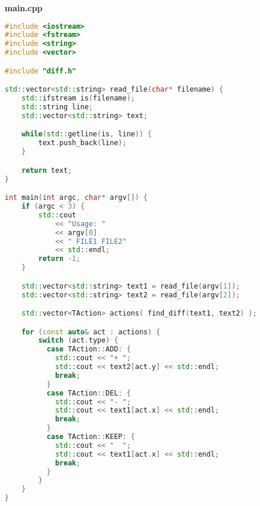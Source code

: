 \textbf{main.cpp}

\begin{lstlisting}[language=C++]
#include <iostream>
#include <fstream>
#include <string>
#include <vector>

#include "diff.h"

std::vector<std::string> read_file(char* filename) {
    std::ifstream is(filename);
    std::string line;
    std::vector<std::string> text;

    while(std::getline(is, line)) {
        text.push_back(line);
    }

    return text;
}

int main(int argc, char* argv[]) {
    if (argc < 3) {
        std::cout 
            << "Usage: " 
            << argv[0] 
            << " FILE1 FILE2" 
            << std::endl;
        return -1;
    }

    std::vector<std::string> text1 = read_file(argv[1]);
    std::vector<std::string> text2 = read_file(argv[2]);

    std::vector<TAction> actions( find_diff(text1, text2) );

    for (const auto& act : actions) {
        switch (act.type) {
          case TAction::ADD: {
            std::cout << "+ ";
            std::cout << text2[act.y] << std::endl;
            break;
          }
          case TAction::DEL: {
            std::cout << "- ";
            std::cout << text1[act.x] << std::endl;
            break;
          }
          case TAction::KEEP: {
            std::cout << "  ";
            std::cout << text1[act.x] << std::endl;
            break;
          }
        }
    }
}
\end{lstlisting}


\pagebreak